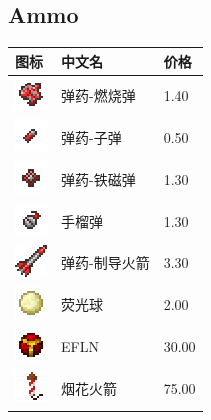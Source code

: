 \documentclass[UTF8]{ctexart}
\begin{document}
\subsection{Ammo}
\begin{longtable}[]{|p{1cm}|p{8cm}|p{1.5cm}|}
\toprule
图标 & 中文名 & 价格\\
\midrule
	\includegraphics{.workspace/icons/openmodularturrets/openmodularturrets__ammo_meta__0.png} & 弹药-燃烧弹 &1.40\\
	\hline
	\includegraphics{.workspace/icons/openmodularturrets/openmodularturrets__ammo_meta__1.png} & 弹药-子弹 &0.50\\
	\hline
	\includegraphics{.workspace/icons/openmodularturrets/openmodularturrets__ammo_meta__2.png} & 弹药-铁磁弹 &1.30\\
	\hline
	\includegraphics{.workspace/icons/openmodularturrets/openmodularturrets__ammo_meta__3.png} & 手榴弹 &1.30\\
	\hline
	\includegraphics{.workspace/icons/openmodularturrets/openmodularturrets__ammo_meta__4.png} & 弹药-制导火箭 &3.30\\
	\hline
	\includegraphics{.workspace/icons/tconstruct/tconstruct__throwball__0.png} & 荧光球 &2.00\\
	\hline
	\includegraphics{.workspace/icons/tconstruct/tconstruct__throwball__1.png} & EFLN &30.00\\
	\hline
	\includegraphics{.workspace/icons/minecraft/minecraft__fireworks__0.png} & 烟花火箭 &75.00\\

\end{longtable}
\end{document}
